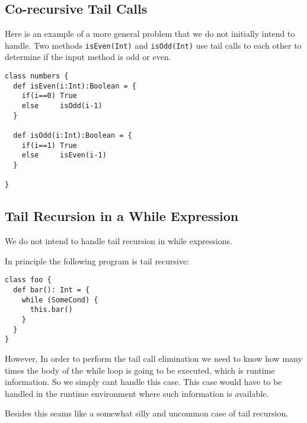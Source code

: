 \subsection{Co-recursive Tail Calls}
\label{sec:corecursionexample}

Here is an example of a more general problem that we do not initially intend to handle. Two methods \texttt{isEven(Int)} and \texttt{isOdd(Int)} use tail calls to each other to determine if the input method is odd or even.

\begin{lstlisting}
class numbers {
  def isEven(i:Int):Boolean = {
    if(i==0) True
    else     isOdd(i-1)
  }
  
  def isOdd(i:Int):Boolean = {
    if(i==1) True
    else     isEven(i-1)
  }
  
}
\end{lstlisting}


\subsection{Tail Recursion in a While Expression}

We do not intend to handle tail recursion in while expressions.

In principle the following program is tail recursive:


\begin{lstlisting}
class foo {
  def bar(): Int = {
    while (SomeCond) {
      this.bar()
    } 
  }
}

\end{lstlisting}
However, In order to perform the tail call elimination we need to know how many times the body of the while loop is going to be executed, which is runtime information. So we simply cant handle this case. This case would have to be handled in the runtime environment where such information is available.

Besides this seams like a somewhat silly and uncommon case of tail recursion.
